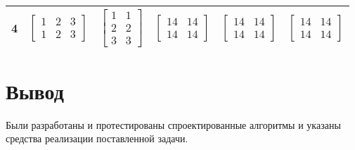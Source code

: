 \begin{table}[h!]
\begin{tabular}{|c|c|c|c|c|c|}
            4 & $\begin{bmatrix} 1 & 2 & 3 \\ 1 & 2 & 3 \end{bmatrix}$ & $\begin{bmatrix} 1 & 1 \\ 2 & 2 \\ 3 & 3 \end{bmatrix}$ & $\begin{bmatrix} 14 & 14 \\ 14 & 14\end{bmatrix}$ & $\begin{bmatrix} 14 & 14 \\ 14 & 14 \end{bmatrix}$ & $\begin{bmatrix} 14 & 14 \\ 14 & 14 \end{bmatrix}$\\ \hline
            \end{tabular}
            \label{table:testing}
        \end{table}

	\section*{Вывод}
	
	
	Были разработаны и протестированы спроектированные алгоритмы и указаны средства реализации поставленной задачи.
    	
\newpage